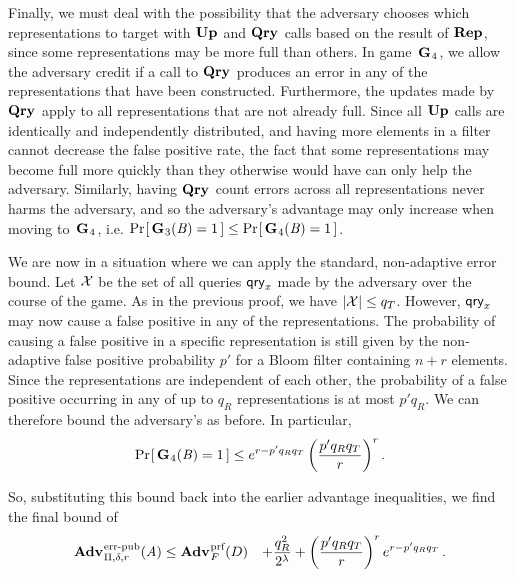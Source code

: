 Finally, we must deal with the possibility that the adversary chooses which
representations to target with $\textup{\textbf{Up}}\hspace{0.5pt}$ and $\textup{\textbf{Qry}}\hspace{0.5pt}$ calls based on the result of
$\textup{\textbf{Rep}}\hspace{0.5pt}$, since some representations may be more full than others. In
game~$\textup{\textbf{G}}\hspace{0.5pt}_4$, we allow the adversary credit if a call to
$\textup{\textbf{Qry}}\hspace{0.5pt}$ produces an error in any of the representations that have been
constructed. Furthermore, the updates made by $\textup{\textbf{Qry}}\hspace{0.5pt}$ apply to all
representations that are not already full. Since all $\textup{\textbf{Up}}\hspace{0.5pt}$ calls are
identically and independently distributed, and having more elements in a filter
cannot decrease the false positive rate, the fact that some representations may
become full more quickly than they otherwise would have can only help the
adversary. Similarly, having $\textup{\textbf{Qry}}\hspace{0.5pt}$ count errors across all representations
never harms the adversary, and so the adversary's advantage may only increase
when moving to~$\textup{\textbf{G}}\hspace{0.5pt}_4$,
i.e. $\Pr\hspace{-1pt}\left[\,\textup{\textbf{G}}\hspace{0.5pt}_3(\mathit{B}) = 1\,\right] \le \Pr\hspace{-1pt}\left[\,\textup{\textbf{G}}\hspace{0.5pt}_4(\mathit{B}) = 1\,\right]$.

We are now in a situation where we can apply the standard, non-adaptive error
bound. Let $\mathcal{X}$ be the set of all queries $\mathsf{qry}_x$ made by the adversary over
the course of the game. As in the previous proof, we have $|\mathcal{X}| \le q_T$.
However, $\mathsf{qry}_x$ may now cause a false positive in any of the representations.
The probability of causing a false positive in a specific representation is
still given by the non-adaptive false positive probability $p'$ for a Bloom
filter containing $n+r$ elements. Since the representations are independent of
each other, the probability of a false positive occurring in any of up to $q_R$
representations is at most $p'q_R$. We can therefore bound the adversary's
as before. In particular,
\begin{equation}
   \Pr\hspace{-1pt}\left[\,\textup{\textbf{G}}\hspace{0.5pt}_4(\mathit{B})=1\,\right] \le
     e^{r-p'q_Rq_T}\left(\frac{p'q_Rq_T}{r}\right)^r.
\end{equation}

So, substituting this bound back into the earlier advantage inequalities, we find the final bound of
\begin{equation*}
  \begin{aligned}
    \Adv{\errep}_{\Pi,\delta,r}(\advA) &\leq \Adv{\prf}_F(D) &  +
    \frac{q_R^2}{2^\lambda} +
    \left(\frac{p'q_Rq_T}{r}\right)^re^{r-p'q_Rq_T} \,.
  \end{aligned}
\end{equation*}
